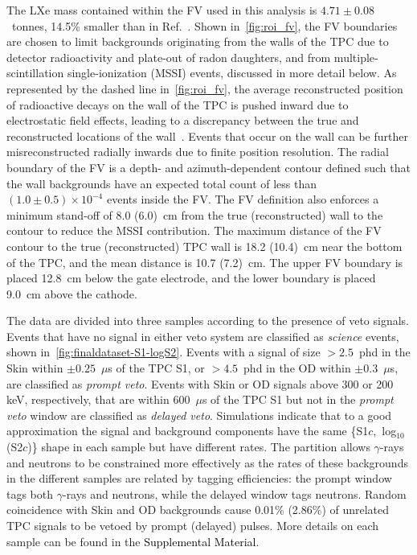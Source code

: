 The LXe mass contained within the FV used in this analysis is $4.71\pm0.08$~tonnes, 14.5\% smaller than in Ref.~\cite{LZ:SR3_WS2024}. 
Shown in~\autoref{fig:roi_fv}, the FV boundaries are chosen to limit backgrounds originating from the walls of the TPC due to detector radioactivity and plate-out of radon daughters, and from multiple-scintillation single-ionization (MSSI) events, discussed in more detail below.
As represented by the dashed line in~\autoref{fig:roi_fv}, the average reconstructed position of radioactive decays on the wall of the TPC is pushed inward due to electrostatic field effects, leading to a discrepancy between the true and reconstructed locations of the wall~\cite{LZ:SR1Backgrounds_2022, LZ:SR3_WS2024}. 
Events that occur on the wall can be further misreconstructed radially inwards due to finite position resolution. 
The radial boundary of the FV is a depth- and azimuth-dependent contour defined such that the wall backgrounds have an expected total count of less than $(1.0 \pm 0.5)\times10^{-4}$ events inside the FV.
The FV definition also enforces a minimum stand-off of 8.0 (6.0)~cm from the true (reconstructed) wall to the contour to reduce the MSSI contribution. 
The maximum distance of the FV contour to the true (reconstructed) TPC wall is 18.2 (10.4)~cm near the bottom of the TPC, and the mean distance is 10.7 (7.2)~cm.
The upper FV boundary is placed 12.8~cm below the gate electrode, and the lower boundary is placed 9.0~cm above the cathode.

The data are divided into three samples according to the presence of veto signals. 
Events that have no signal in either veto system are classified as \emph{science} events, shown in~\autoref{fig:finaldataset-S1-logS2}.
Events with a signal of size $> 2.5$~phd in the Skin within $\pm 0.25$~$\mu$s of the TPC S1, or $> 4.5$~phd in the OD within $\pm 0.3$~$\mu$s, are classified as \emph{prompt veto}. 
Events with Skin or OD signals above 300 or 200 keV, respectively, that are within $600$~$\mu$s of the TPC S1 but not in the \emph{prompt veto} window are classified  as \emph{delayed veto}.
Simulations indicate that to a good approximation the signal and background components have the same \{S1$c$,~log$_{10}$(S2$c$)\} shape in each sample but have different rates.
The partition allows $\gamma$-rays and neutrons to be constrained more effectively as the rates of these backgrounds in the different samples are related by tagging efficiencies: the prompt window tags both $\gamma$-rays and neutrons, while the delayed window tags neutrons. 
Random coincidence with Skin and OD backgrounds cause 0.01\% (2.86\%) of unrelated TPC signals to be vetoed by prompt (delayed) pulses. More details on each sample can be found in the \textcolor{black}{Supplemental Material}.

